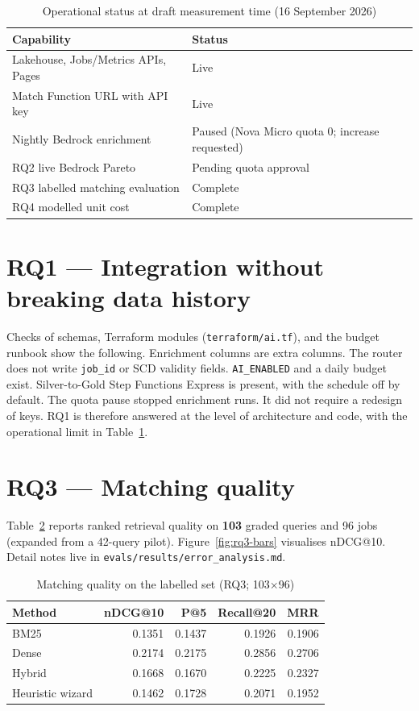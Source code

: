 \begin{table}[ht]
\centering
\caption{Operational status at draft measurement time (16 September 2026)}
\label{tab:status}
\begin{tabularx}{\textwidth}{@{}lX@{}}
\toprule
\textbf{Capability} & \textbf{Status} \\
\midrule
Lakehouse, Jobs/Metrics APIs, Pages & Live \\
Match Function URL with API key & Live \\
Nightly Bedrock enrichment & Paused (Nova Micro quota 0; increase requested) \\
RQ2 live Bedrock Pareto & Pending quota approval \\
RQ3 labelled matching evaluation & Complete \\
RQ4 modelled unit cost & Complete \\
\bottomrule
\end{tabularx}
\end{table}

\section{RQ1 --- Integration without breaking data history}
\label{sec:rq1-results}

Checks of schemas, Terraform modules (\texttt{terraform/ai.tf}), and the budget runbook show the following. Enrichment columns are extra columns. The router does not write \texttt{job\_id} or SCD validity fields. \texttt{AI\_ENABLED} and a daily budget exist. Silver-to-Gold Step Functions Express is present, with the schedule off by default. The quota pause stopped enrichment runs. It did not require a redesign of keys. RQ1 is therefore answered at the level of architecture and code, with the operational limit in Table~\ref{tab:status}.

\section{RQ3 --- Matching quality}
\label{sec:rq3}

Table~\ref{tab:rq3} reports ranked retrieval quality on \textbf{103} graded queries and 96 jobs (expanded from a 42-query pilot). Figure~\ref{fig:rq3-bars} visualises nDCG@10. Detail notes live in \texttt{evals/results/error\_analysis.md}.

\begin{table}[ht]
\centering
\small
\caption{Matching quality on the labelled set (RQ3; 103$\times$96)}
\label{tab:rq3}
\begin{tabular}{@{}lrrrr@{}}
\toprule
\textbf{Method} & \textbf{nDCG@10} & \textbf{P@5} & \textbf{Recall@20} & \textbf{MRR} \\
\midrule
BM25 & 0.1351 & 0.1437 & 0.1926 & 0.1906 \\
Dense & 0.2174 & 0.2175 & 0.2856 & 0.2706 \\
Hybrid & 0.1668 & 0.1670 & 0.2225 & 0.2327 \\
Heuristic wizard & 0.1462 & 0.1728 & 0.2071 & 0.1952 \\
\bottomrule
\end{tabular}
\end{table}

